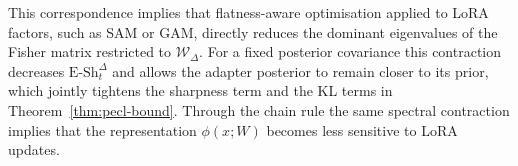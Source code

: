 \documentclass{article}
\theoremstyle{plain}
\theoremstyle{definition}
\theoremstyle{remark}
\begin{document}
This correspondence implies that flatness-aware optimisation applied to LoRA factors, such as SAM or GAM, directly reduces the dominant eigenvalues of the Fisher matrix restricted to $\mathcal W_\Delta$. For a fixed posterior covariance this contraction decreases $\mathrm{E\text{-}Sh}_t^\Delta$ and allows the adapter posterior to remain closer to its prior, which jointly tightens the sharpness term and the KL terms in Theorem~\ref{thm:pecl-bound}. Through the chain rule the same spectral contraction implies that the representation $\phi(x;W)$ becomes less sensitive to LoRA updates.

\end{document}
